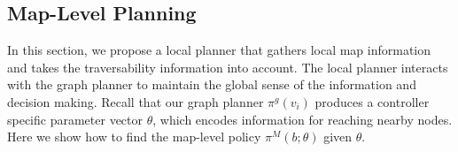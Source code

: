 \documentclass[letterpaper, 10 pt, conference]{ieeeconf}  %
\newcommand{\ph}[1]{{\textbf{#1}:}} %
\newcommand{\todo}[1]{{\color{red} #1 }} %
\newcommand{\argmax}{\mathop{\mathrm{argmax}}}
\begin{document}








\subsection{Map-Level Planning}
In this section, we propose a local planner that gathers local map information and takes the traversability information into account. The local planner interacts with the graph planner to maintain the global sense of the information and decision making.  Recall that our graph planner $\pi^g(v_i)$ produces a controller specific parameter vector $\theta$, which encodes information for reaching nearby nodes.  Here we show how to find the map-level policy $\pi^M(b;\theta)$ given $\theta$.
\end{document}
